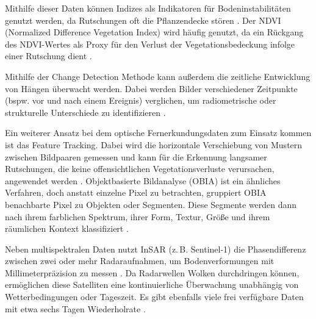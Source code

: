 \documentclass[../main.tex]{subfiles}
\begin{document}
Mithilfe dieser Daten können Indizes als Indikatoren für Bodeninstabilitäten genutzt werden, da Rutschungen oft die Pflanzendecke stören \autocite{piacentiniStatisticalAnalysisAssessing2012, vanwykdevriesDetectionSlowmovingLandslides2024}. Der NDVI (Normalized Difference Vegetation Index) wird häufig genutzt, da ein Rückgang des NDVI-Wertes als Proxy für den Verlust der Vegetationsbedeckung infolge einer Rutschung dient \autocite{vanwykdevriesDetectionSlowmovingLandslides2024, scaioniRemoteSensingLandslide2014, strzabalaIdentificationLandslidePrecursors2024}.

Mithilfe der Change Detection Methode kann außerdem die zeitliche Entwicklung von Hängen überwacht werden. Dabei werden Bilder verschiedener Zeitpunkte (bspw. vor und nach einem Ereignis) verglichen, um radiometrische oder strukturelle Unterschiede zu identifizieren \autocite{kaabRemoteSensingGlacier2005, scaioniRemoteSensingLandslide2014, strzabalaIdentificationLandslidePrecursors2024}.

Ein weiterer Ansatz bei dem optische Fernerkundungsdaten zum Einsatz kommen ist das Feature Tracking. Dabei wird die horizontale Verschiebung von Mustern zwischen Bildpaaren gemessen und kann für die Erkennung langsamer Rutschungen, die keine offensichtlichen Vegetationsverluste verursachen, angewendet werden \autocite{vanwykdevriesDetectionSlowmovingLandslides2024}. Objektbasierte Bildanalyse (OBIA) ist ein ähnliches Verfahren, doch anstatt einzelne Pixel zu betrachten, gruppiert OBIA benachbarte Pixel zu Objekten oder Segmenten. Diese Segmente werden dann nach ihrem farblichen Spektrum, ihrer Form, Textur, Größe und ihrem räumlichen Kontext klassifiziert \autocite{jinAccurateLandslideIdentification2022, scaioniRemoteSensingLandslide2014}.

Neben multispektralen Daten nutzt InSAR (z.\,B. Sentinel-1) die Phasendifferenz zwischen zwei oder mehr Radaraufnahmen, um Bodenverformungen mit Millimeterpräzision zu messen \autocite{kaabRemoteSensingGlacier2005, scaioniRemoteSensingLandslide2014, strzabalaIdentificationLandslidePrecursors2024}. Da Radarwellen Wolken durchdringen können, ermöglichen diese Satelliten eine kontinuierliche Überwachung unabhängig von Wetterbedingungen oder Tageszeit. Es gibt ebenfalls viele frei verfügbare Daten mit etwa sechs Tagen Wiederholrate \autocite{kaabRemoteSensingGlacier2005, scaioniRemoteSensingLandslide2014, strzabalaIdentificationLandslidePrecursors2024}.
\end{document}
